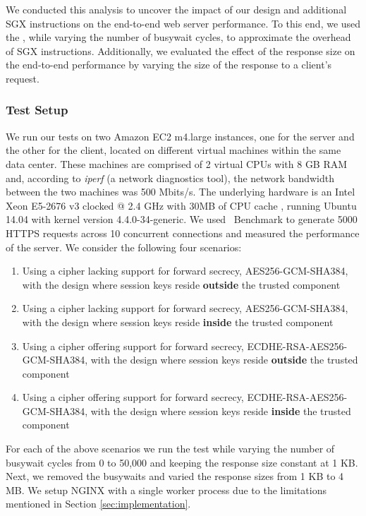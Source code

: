 \documentclass[../../../main.tex]{subfiles}
\begin{document}
\label{sec:endtoend}
We conducted this analysis to uncover the impact of our design and
additional SGX instructions on the end-to-end web server performance.
To this end, we used the \enclavemodel, while varying the
number of busywait cycles, to approximate the overhead of SGX
instructions. Additionally, we evaluated the effect of the response
size on the end-to-end performance by varying the size of the response
to a client's request.

\subsubsection*{Test Setup}
We run our tests on two Amazon EC2 m4.large instances, one for the
server and the other for the client, located on different virtual
machines within the same data center. These machines are comprised of
2 virtual CPUs with 8 GB RAM and, according to \textit{iperf} (a
network diagnostics tool), the network bandwidth between the two
machines was 500 Mbits/s. The underlying hardware is an Intel Xeon
E5-2676 v3 clocked @ 2.4 GHz with 30MB of CPU cache
\cite{aws_instances}, running Ubuntu 14.04 with kernel version
4.4.0-34-generic. We used \Apache~Benchmark to generate 5000 HTTPS
requests across 10 concurrent connections and measured the performance
of the server. We consider the following four scenarios:
\begin{enumerate}
  \item Using a cipher lacking support for forward secrecy, AES256-GCM-SHA384,
    with the design where session keys reside \textbf{outside} the trusted
    component
  \item Using a cipher lacking support for forward secrecy, AES256-GCM-SHA384,
    with the design where session keys reside \textbf{inside} the trusted
    component
  \item Using a cipher offering support for forward secrecy,
    ECDHE-RSA-AES256-GCM-SHA384, with the design where session keys reside
    \textbf{outside} the trusted component
  \item Using a cipher offering support for forward secrecy,
    ECDHE-RSA-AES256-GCM-SHA384, with the design where session keys reside
    \textbf{inside} the trusted component
\end{enumerate}

For each of the above scenarios we run the test while varying the
number of busywait cycles from 0 to 50,000 and keeping the response
size constant at 1 KB. Next, we removed the busywaits and varied the
response sizes from 1 KB to 4 MB. We setup NGINX with a single worker
process due to the limitations mentioned in Section
\ref{sec:implementation}.
\end{document}
